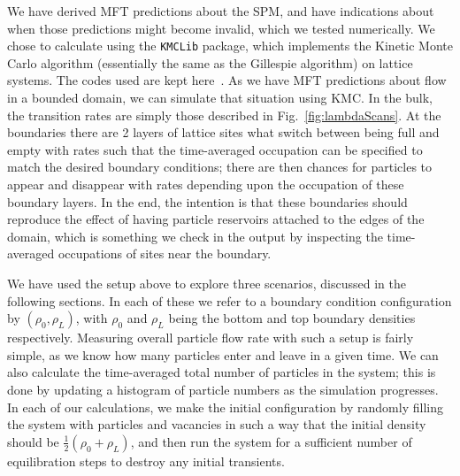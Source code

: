 \documentclass[
reprint,
 amsmath,amssymb,
 aps,
 prl,
]{revtex4-1}
\begin{document}
We have derived MFT predictions about the SPM, and have indications about when those predictions might become invalid, which we tested numerically.
We chose to calculate using the \texttt{KMCLib}\cite{leetmaa2014kmclib} package, which implements the Kinetic Monte Carlo algorithm
(essentially the same as the Gillespie algorithm\cite{Gillespie1977, Bortz1975, Prados1997})
on lattice systems. The codes used are kept here~\cite{jHellGitRepo}.
As we have MFT predictions about flow in a bounded domain, we can simulate that situation using KMC. In the bulk, the transition rates are simply those described in Fig.~\ref{fig:lambdaScans}. At the boundaries
there are 2 layers of lattice sites what switch between being full and empty with rates such that the time-averaged occupation can be specified to match the desired boundary conditions; there are then chances for particles to appear
and disappear with rates depending upon the occupation of these boundary layers. In the end, the intention is that these boundaries should reproduce the effect of having particle reservoirs attached to the edges of the domain,
which is something we check
in the output by inspecting the time-averaged occupations of sites near the boundary. 

We have used the setup above to explore three scenarios, discussed in the following sections. In each of these we refer to a boundary condition configuration
by $(\rho_0, \rho_L)$, with $\rho_0$ and $\rho_L$ being the bottom and top boundary densities respectively.
Measuring overall particle flow rate with such a setup is fairly simple, as we know how many particles enter and leave in a given time.
We can also calculate the time-averaged total number of particles in the system; this is done by updating a histogram of particle numbers
as the simulation progresses. In each of our calculations, we make the initial configuration by randomly filling the system with particles and vacancies in such a way that the initial density should be $\frac{1}{2}(\rho_0 + \rho_L)$, and then
run the system for a sufficient number of equilibration steps to destroy any initial transients.
\end{document}
